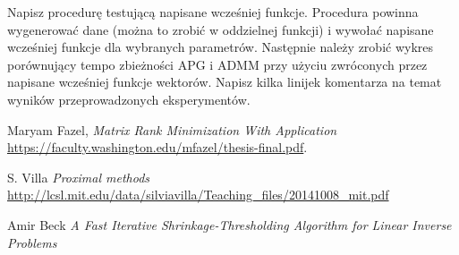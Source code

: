 \documentclass[10pt,a4paper,draft]{report}
\begin{document}
\begin{problem}
Napisz procedurę testującą napisane wcześniej funkcje. Procedura powinna wygenerować dane (można to zrobić w oddzielnej funkcji) i wywołać napisane wcześniej funkcje dla wybranych parametrów. Następnie należy zrobić wykres porównujący tempo zbieżności APG i ADMM przy użyciu zwróconych przez napisane wcześniej funkcje wektorów. Napisz kilka linijek komentarza na temat wyników przeprowadzonych eksperymentów.
\end{problem}

\begin{thebibliography}{1}

 Maryam Fazel, {\em Matrix Rank Minimization With Application} \url{https://faculty.washington.edu/mfazel/thesis-final.pdf}.

 S. Villa {\em Proximal methods}
\url{http://lcsl.mit.edu/data/silviavilla/Teaching_files/20141008_mit.pdf}

 Amir Beck {\em A Fast Iterative Shrinkage-Thresholding Algorithm
for Linear Inverse Problems}

\end{thebibliography}
\end{document}
